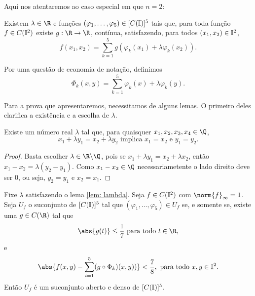 Aqui nos atentaremos ao caso especial em que \( n = 2 \):
\begin{teo}
    Existem \( \lambda \in \R \) e funções \( ( \varphi_{ 1 }, \dots, \varphi_{ 5 } ) \in [C(\mathbb{I})]^{ 5 } \) tais que, para toda função \( f \in C(\mathbb{I}^{ 2 }) \) existe \( g : \R \to \R \), contínua, satisfazendo, para todos \( ( x_{ 1 }, x_{ 2 } ) \in \mathbb{I}^{ 2 } \),
    \begin{equation}
        f ( x_{ 1 }, x_{ 2 } ) =
        \sum_{ k=1 }^{ 5 } g ( \varphi_{ k } ( x_{ 1 } ) + \lambda \varphi_{ k } ( x_{ 2 } ) )
    .\end{equation}
    \label{teo: hilbert13}
\end{teo}
\begin{rem}
    Por uma questão de economia de notação, definimos
    \begin{equation}
        \Phi_{ k }(x, y) = \sum_{ k=1 }^{ 5 } \varphi_{ k } (x) + \lambda \varphi_{ k } (y)
    .\end{equation}
\end{rem}
Para a prova que apresentaremos, necessitamos de alguns lemas.
O primeiro deles clarifica a existência e a escolha de \( \lambda \).
\begin{lem}
    Existe um número real \( \lambda \) tal que, para quaisquer \( x_{ 1 }, x_{ 2 }, x_{ 3 }, x_{ 4 } \in \Q \),
    \begin{equation}
        x_{ 1 } + \lambda y_{ 1 } = x_{ 2 } + \lambda y_{ 2 }
        \text{ implica }
        x_{ 1 } = x_{ 2 } \text{ e } y_{ 1 } = y_{ 2 }
    .\end{equation}
    \label{lem: lambda}
\end{lem}
\begin{proof}
    Basta escolher \( \lambda \in \R \backslash \Q \), pois se \( x_{ 1 } + \lambda y_{ 1 } = x_{ 2 } + \lambda x_{ 2 } \), então \( x_{ 1 } - x_{ 2 } = \lambda ( y_{ 2 } - y_{ 1 } ) \).
    Como \( x_{ 1 } - x_{ 2 } \in \Q \) necessariametente o lado direito deve ser \( 0 \), ou seja, \( y_{ 2 } = y_{ 1 } \) e \( x_{ 2 } = x_{ 1 } \).
\end{proof}
\begin{lem}
    Fixe \( \lambda \) satisfazendo o lema \ref{lem: lambda}.
    Seja \( f \in C(\mathbb{I}^2) \) com \( \norm{ f }_{ \infty } = 1 \).
    Seja \( U_{ f } \) o suconjunto de \( [C(\mathbb{I})]^{ 5 } \) tal que \( ( \varphi_{ 1 }, \dots, \varphi_{ 5 } ) \in U_{ f } \) se, e somente se, existe uma \( g \in C(\R) \) tal que
    \begin{equation}
        \abs{ g(t) } \leq \frac{ 1 }{ 7 } \text{ para todo } t \in \R
        \label{eq: g_bound}
    ,\end{equation}
    e
    \begin{equation}
        \abs{ 
            f(x, y)
            - \sum_{ i=1 }^{ 5 } (g \circ \Phi_{ k })(x, y) )
         }
         < \frac{ 7 }{ 8 }, \text{ para todo } x, y \in \I^2
         \label{eq: dif_bound}
    .\end{equation}
    Então \( U_{ f } \) é um suconjunto aberto e denso de \( [C(\mathbb{I})]^{ 5 } \).
    \label{lem: uf}
\end{lem}
